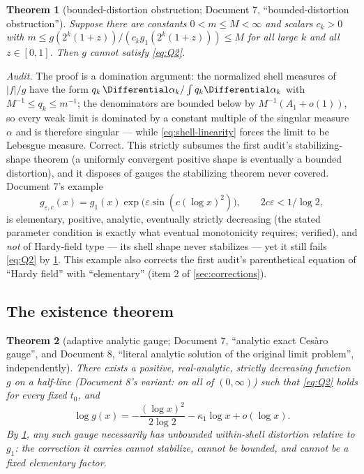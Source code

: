 \documentclass[11pt,oneside]{article}
\newtheorem{theorem}{Theorem}[section]
\theoremstyle{definition}
\theoremstyle{remark}
\begin{document}
\begin{theorem}[bounded-distortion obstruction; Document 7,
``bounded-distortion obstruction'']
\label{thm:bounded-distortion}
Suppose there are constants $0<m\le M<\infty$ and scalars $c_k>0$ with
$m\le g(2^k(1+z))/(c_kg_1(2^k(1+z)))\le M$ for all large $k$ and all
$z\in[0,1]$.  Then $g$ cannot satisfy \eqref{eq:Q2}.
\end{theorem}

\emph{Audit.}  The proof is a domination argument: the normalized shell
measures of $|f|/g$ have the form $q_k\,\Differential\alpha_k/\int q_k\Differential\alpha_k$
with $M^{-1}\le q_k\le m^{-1}$; the denominators are bounded below by
$M^{-1}(A_1+o(1))$, so every weak limit is dominated by a constant
multiple of the singular measure $\alpha$ and is therefore singular ---
while \eqref{eq:shell-linearity} forces the limit to be Lebesgue
measure.  Correct.  This strictly subsumes the first audit's
stabilizing-shape theorem (a uniformly convergent positive shape is
eventually a bounded distortion), and it disposes of gauges the
stabilizing theorem never covered.  Document 7's example
\[
 g_{\varepsilon,c}(x)=g_1(x)\exp\bigl(\varepsilon\sin(c(\log x)^2)\bigr),
 \qquad 2c\varepsilon<1/\log2,
\]
is elementary, positive, analytic, eventually strictly decreasing
(the stated parameter condition is exactly what eventual monotonicity
requires; verified), and \emph{not} of Hardy-field type --- its shell
shape never stabilizes --- yet it still fails \eqref{eq:Q2} by
\cref{thm:bounded-distortion}.  This example also corrects the first
audit's parenthetical equation of ``Hardy field'' with ``elementary''
(item 2 of \cref{sec:corrections}).

\subsection{The existence theorem}
\label{ssec:existence}

\begin{theorem}[adaptive analytic gauge; Document 7, ``analytic exact
Ces\`aro gauge'', and Document 8, ``literal analytic solution of the
original limit problem'', independently]
\label{thm:adaptive}
There exists a positive, real-analytic, strictly decreasing function
$g$ on a half-line (Document 8's variant: on all of $(0,\infty)$) such
that \eqref{eq:Q2} holds for every fixed $t_0$, and
\[
 \log g(x)=-\frac{(\log x)^2}{2\log2}-\kappa_1\log x+o(\log x).
\]
By \cref{thm:bounded-distortion}, any such gauge necessarily has
\emph{unbounded} within-shell distortion relative to $g_1$: the
correction it carries cannot stabilize, cannot be bounded, and cannot be
a fixed elementary factor.
\end{theorem}
\end{document}
